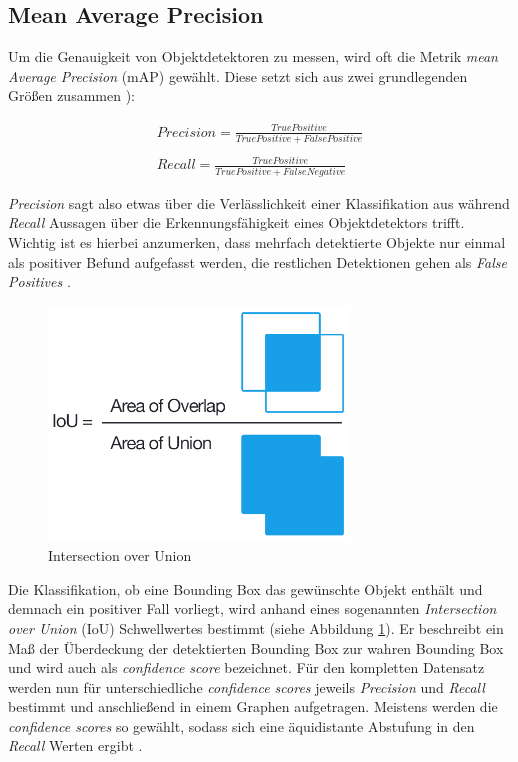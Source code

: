 \subsection*{Mean Average Precision}

Um die Genauigkeit von Objektdetektoren zu messen, wird oft die Metrik \textit{mean Average Precision} (mAP) gewählt. Diese setzt sich aus zwei grundlegenden Größen zusammen \cite{JonathanHui.20180307}):

\begin{equation} \label{precisionandrecall}
\begin{split}
Precision = \frac{True Positive}{True Positive + False Positive} \\
\\
Recall = \frac{True Positive}{True Positive + False Negative}
\end{split}
\end{equation}

\textit{Precision} sagt also etwas über die Verlässlichkeit einer Klassifikation aus während \textit{Recall} Aussagen über die Erkennungsfähigkeit eines Objektdetektors trifft. Wichtig ist es hierbei anzumerken, dass mehrfach detektierte Objekte nur einmal als positiver Befund aufgefasst werden, die restlichen Detektionen gehen als \textit{False Positives} \cite{TarangShah.20180127}.

\begin{figure}[ht]
	\begin{center}
		\includegraphics[width=8cm]{Bilder/iou_equation.png} 
		\caption[Intersection over Union]{Intersection over Union \cite{AdrianRosebrock.20161107}}
		\label{iou}
	\end{center}
\end{figure}

Die Klassifikation, ob eine Bounding Box das gewünschte Objekt enthält und demnach ein positiver Fall vorliegt, wird anhand eines sogenannten \textit{Intersection over Union} (IoU) Schwellwertes bestimmt (siehe Abbildung \ref{iou}). Er beschreibt ein Maß der Überdeckung der detektierten Bounding Box zur wahren Bounding Box und wird auch als \textit{confidence score} bezeichnet. Für den kompletten Datensatz werden nun für unterschiedliche \textit{confidence scores} jeweils \textit{Precision} und \textit{Recall} bestimmt und anschließend in einem Graphen aufgetragen. Meistens werden die \textit{confidence scores} so gewählt, sodass sich eine äquidistante Abstufung in den \textit{Recall} Werten ergibt \cite{TarangShah.20180127}. 

